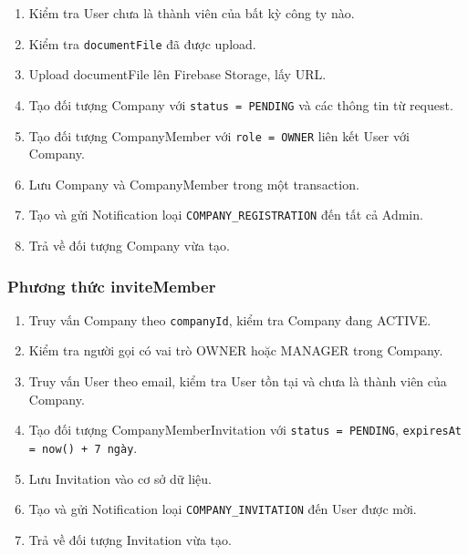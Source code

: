 \begin{enumerate}
    \item Kiểm tra User chưa là thành viên của bất kỳ công ty nào.
    \item Kiểm tra \texttt{documentFile} đã được upload.
    \item Upload documentFile lên Firebase Storage, lấy URL.
    \item Tạo đối tượng Company với \texttt{status = PENDING} và các thông tin từ request.
    \item Tạo đối tượng CompanyMember với \texttt{role = OWNER} liên kết User với Company.
    \item Lưu Company và CompanyMember trong một transaction.
    \item Tạo và gửi Notification loại \texttt{COMPANY\_REGISTRATION} đến tất cả Admin.
    \item Trả về đối tượng Company vừa tạo.
\end{enumerate}

\subsubsection{Phương thức inviteMember}

\begin{enumerate}
    \item Truy vấn Company theo \texttt{companyId}, kiểm tra Company đang ACTIVE.
    \item Kiểm tra người gọi có vai trò OWNER hoặc MANAGER trong Company.
    \item Truy vấn User theo email, kiểm tra User tồn tại và chưa là thành viên của Company.
    \item Tạo đối tượng CompanyMemberInvitation với \texttt{status = PENDING}, \texttt{expiresAt = now() + 7 ngày}.
    \item Lưu Invitation vào cơ sở dữ liệu.
    \item Tạo và gửi Notification loại \texttt{COMPANY\_INVITATION} đến User được mời.
    \item Trả về đối tượng Invitation vừa tạo.
\end{enumerate}
